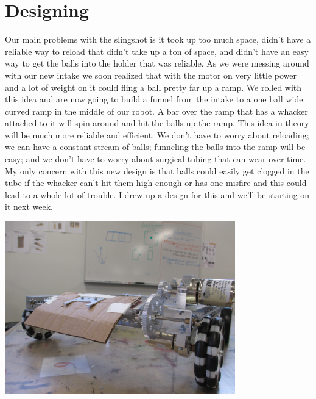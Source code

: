 \section*{Designing}
Our main problems with the slingshot is it took up too much space, didn’t have a reliable way to reload that didn’t take up a ton of space, and didn’t have an easy way to get the balls into the holder that was reliable. As we were messing around with our new intake we soon realized that with the motor on very little power and a lot of weight on it could fling a ball pretty far up a ramp. We rolled with this idea and are now going to build a funnel from the intake to a one ball wide curved ramp in the middle of our robot. A bar over the ramp that has a whacker attached to it will spin around and hit the balls up the ramp. This idea in theory will be much more reliable and efficient. We don’t have to worry about reloading; we can have a constant stream of balls; funneling the balls into the ramp will be easy; and we don’t have to worry about surgical tubing that can wear over time. My only concern with this new design is that balls could easily get clogged in the tube if the whacker can’t hit them high enough or has one misfire and this could lead to a whole lot of trouble. I drew up a design for this and we’ll be starting on it next week. 

\begin{center}
\includegraphics[width=10cm]{./Entries/Images/NewIntake.jpg}
\end{center}
